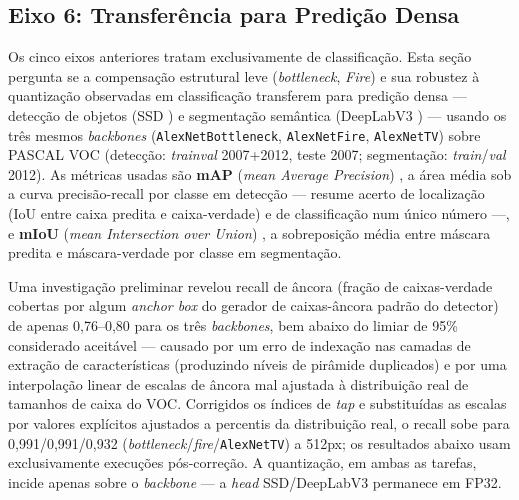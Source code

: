 \documentclass[conference]{IEEEtran}
\begin{document}
\subsection{Eixo 6: Transferência para Predição Densa}
\label{sec:contrib6}

Os cinco eixos anteriores tratam exclusivamente de classificação. Esta seção pergunta se a
compensação estrutural leve (\textit{bottleneck}, \textit{Fire}) e sua robustez à quantização
observadas em classificação transferem para predição densa — detecção de objetos (SSD
\cite{liu2016ssd}) e segmentação semântica (DeepLabV3 \cite{chen2017rethinking}) — usando os três
mesmos \textit{backbones} (\texttt{AlexNetBottleneck}, \texttt{AlexNetFire},
\texttt{AlexNetTV}) sobre PASCAL VOC \cite{everingham2010pascal} (detecção: \textit{trainval}
2007+2012, teste 2007; segmentação: \textit{train}/\textit{val} 2012). As métricas usadas são
\textbf{mAP} (\textit{mean Average Precision}) \cite{everingham2010pascal}, a área média sob a
curva precisão-recall por classe em detecção — resume acerto de localização (IoU entre caixa
predita e caixa-verdade) e de classificação num único número —, e \textbf{mIoU} (\textit{mean
Intersection over Union}) \cite{long2015fcn}, a sobreposição média entre máscara predita e
máscara-verdade por classe em segmentação.

Uma investigação preliminar revelou recall de âncora (fração de caixas-verdade cobertas por algum
\textit{anchor box} do gerador de caixas-âncora padrão do detector) de apenas 0,76--0,80 para os três
\textit{backbones}, bem abaixo do limiar de 95\% considerado aceitável — causado por um erro de
indexação nas camadas de extração de características (produzindo níveis de pirâmide duplicados) e
por uma interpolação linear de escalas de âncora mal ajustada à distribuição real de tamanhos de
caixa do VOC. Corrigidos os índices de \textit{tap} e substituídas as escalas por valores
explícitos ajustados a percentis da distribuição real, o recall sobe para 0,991/0,991/0,932
(\textit{bottleneck}/\textit{fire}/\texttt{AlexNetTV}) a 512px; os resultados abaixo usam
exclusivamente execuções pós-correção. A quantização, em ambas as tarefas, incide apenas sobre o
\textit{backbone} — a \textit{head} SSD/DeepLabV3 permanece em FP32.
\end{document}
